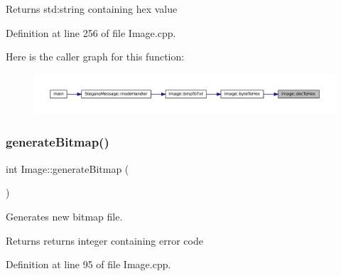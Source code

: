 \begin{DoxyReturn}{Returns}
std\+:string containing hex value 
\end{DoxyReturn}


Definition at line 256 of file Image.\+cpp.

Here is the caller graph for this function\+:
\nopagebreak
\begin{figure}[H]
\begin{center}
\leavevmode
\includegraphics[width=350pt]{classImage_a26f7e0b2649e2529df7e7aea46f2da4a_icgraph}
\end{center}
\end{figure}
\mbox{\label{classImage_a3ca1ae6c1eb2846bfba066b01e6020e1}} 
\subsubsection{\texorpdfstring{generateBitmap()}{generateBitmap()}}
{\footnotesize\ttfamily int Image\+::generate\+Bitmap (\begin{DoxyParamCaption}{ }\end{DoxyParamCaption})}



Generates new bitmap file. 

\begin{DoxyReturn}{Returns}
returns integer containing error code 
\end{DoxyReturn}


Definition at line 95 of file Image.\+cpp.

